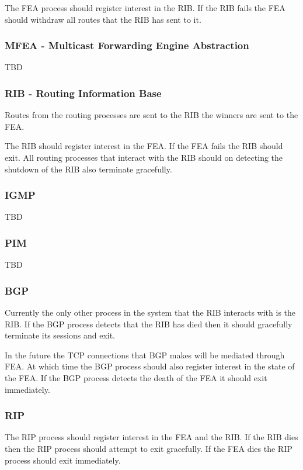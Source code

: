 \documentclass[11pt]{article}
\begin{document}
The FEA process should register interest in the RIB. If the RIB fails
the FEA should withdraw all routes that the RIB has sent to it.

\subsubsection{MFEA - Multicast Forwarding Engine Abstraction}

TBD

\subsubsection{RIB - Routing Information Base}

Routes from the routing processes are sent to the RIB the winners are
sent to the FEA.

The RIB should register interest in the FEA. If the FEA fails the RIB
should exit. All routing processes that interact with the RIB should
on detecting the shutdown of the RIB also terminate gracefully.

\subsubsection{IGMP}

TBD

\subsubsection{PIM}

TBD

\subsubsection{BGP}

Currently the only other process in the system that the RIB interacts
with is the RIB. If the BGP process detects that the RIB has died then
it should gracefully terminate its sessions and exit.

In the future the TCP connections that BGP makes will be mediated
through FEA. At which time the BGP process should also register
interest in the state of the FEA. If the BGP process detects the death
of the FEA it should exit immediately.

\subsubsection{RIP}

The RIP process should register interest in the FEA and the RIB. If
the RIB dies then the RIP process should attempt to exit gracefully.
If the FEA dies the RIP process should exit immediately.
\end{document}
